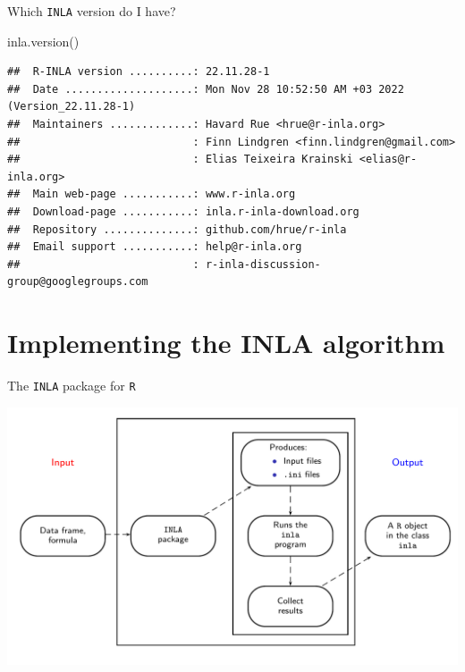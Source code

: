 \documentclass[
  ignorenonframetext,
]{beamer}
\newenvironment{Shaded}{\begin{snugshade}}{\end{snugshade}}
\newcommand{\FunctionTok}[1]{\textcolor[rgb]{0.00,0.00,0.00}{#1}}
\newcommand{\NormalTok}[1]{#1}
\begin{document}
\begin{frame}[fragile]{Which \texttt{INLA} version do I have?}
\protect\hypertarget{which-inla-version-do-i-have}{}
\begin{Shaded}
\begin{Highlighting}[]
\FunctionTok{inla.version}\NormalTok{()}
\end{Highlighting}
\end{Shaded}

\begin{verbatim}
##  R-INLA version ..........: 22.11.28-1
##  Date ....................: Mon Nov 28 10:52:50 AM +03 2022 (Version_22.11.28-1)
##  Maintainers .............: Havard Rue <hrue@r-inla.org>
##                           : Finn Lindgren <finn.lindgren@gmail.com>
##                           : Elias Teixeira Krainski <elias@r-inla.org>
##  Main web-page ...........: www.r-inla.org
##  Download-page ...........: inla.r-inla-download.org
##  Repository ..............: github.com/hrue/r-inla
##  Email support ...........: help@r-inla.org
##                           : r-inla-discussion-group@googlegroups.com
\end{verbatim}
\end{frame}

\hypertarget{implementing-the-inla-algorithm}{%
\section{Implementing the INLA
algorithm}\label{implementing-the-inla-algorithm}}

\begin{frame}{The \texttt{INLA} package for \texttt{R}}
\protect\hypertarget{the-inla-package-for-r}{}
\begin{center}\includegraphics[width=1\linewidth]{graphics3/inla-structure} \end{center}
\end{frame}
\end{document}
